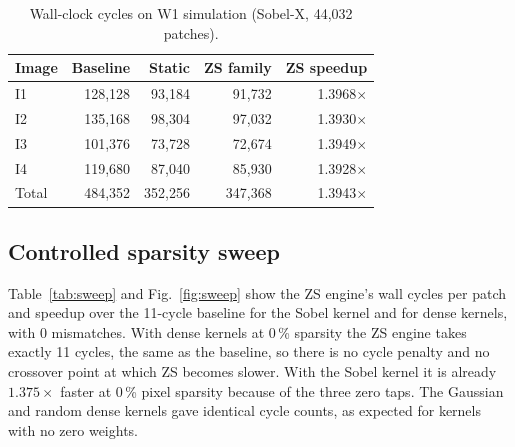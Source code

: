 \documentclass[11pt,journal,draftclsnofoot,onecolumn]{IEEEtran}
\begin{document}
\begin{table}[t]
\centering
\caption{Wall-clock cycles on W1 simulation (Sobel-X, 44{,}032 patches).}
\label{tab:sobel}
\small
\setlength{\tabcolsep}{8pt}
\begin{tabular}{lrrrr}
\toprule
\textbf{Image} & \textbf{Baseline} & \textbf{Static} & \textbf{ZS family} & \textbf{ZS speedup}\\
\midrule
I1 & 128{,}128 &  93{,}184 &  91{,}732 & 1.3968$\times$\\
I2 & 135{,}168 &  98{,}304 &  97{,}032 & 1.3930$\times$\\
I3 & 101{,}376 &  73{,}728 &  72{,}674 & 1.3949$\times$\\
I4 & 119{,}680 &  87{,}040 &  85{,}930 & 1.3928$\times$\\
\midrule
Total & 484{,}352 & 352{,}256 & 347{,}368 & 1.3943$\times$\\
\bottomrule
\end{tabular}
\end{table}

\subsection{Controlled sparsity sweep}
Table~\ref{tab:sweep} and Fig.~\ref{fig:sweep} show the ZS engine's wall cycles per patch
and speedup over the 11-cycle baseline for the Sobel kernel and for dense kernels, with 0
mismatches. With dense kernels at 0\,\% sparsity the ZS engine takes exactly 11 cycles,
the same as the baseline, so there is no cycle penalty and no crossover point at which ZS
becomes slower. With the Sobel kernel it is already $1.375\times$ faster at 0\,\% pixel
sparsity because of the three zero taps. The Gaussian and random dense kernels gave
identical cycle counts, as expected for kernels with no zero weights.
\end{document}
